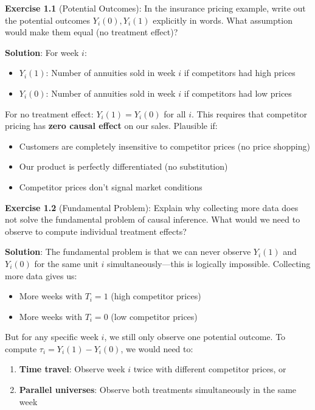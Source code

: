 \textbf{Exercise 1.1} (Potential Outcomes): In the insurance pricing
example, write out the potential outcomes \(Y_i(0), Y_i(1)\) explicitly
in words. What assumption would make them equal (no treatment effect)?

\textbf{Solution}: For week $i$:
\begin{itemize}
\item $Y_i(1)$: Number of annuities sold in week $i$ if competitors had high prices
\item $Y_i(0)$: Number of annuities sold in week $i$ if competitors had low prices
\end{itemize}

For no treatment effect: $Y_i(1) = Y_i(0)$ for all $i$. This
requires that competitor pricing has \textbf{zero causal effect} on our
sales. Plausible if:
\begin{itemize}
\item Customers are completely insensitive to competitor prices (no price shopping)
\item Our product is perfectly differentiated (no substitution)
\item Competitor prices don't signal market conditions
\end{itemize}

\textbf{Exercise 1.2} (Fundamental Problem): Explain why collecting more
data does not solve the fundamental problem of causal inference. What
would we need to observe to compute individual treatment effects?

\textbf{Solution}: The fundamental problem is that we can never observe
$Y_i(1)$ and $Y_i(0)$ for the same unit $i$ simultaneously---this
is logically impossible. Collecting more data gives us:
\begin{itemize}
\item More weeks with $T_i = 1$ (high competitor prices)
\item More weeks with $T_i = 0$ (low competitor prices)
\end{itemize}

But for any specific week $i$, we still only observe one potential
outcome. To compute $\tau_i = Y_i(1) - Y_i(0)$, we would need to:
\begin{enumerate}
\item \textbf{Time travel}: Observe week $i$ twice with different competitor prices, or
\item \textbf{Parallel universes}: Observe both treatments simultaneously in the same week
\end{enumerate}

